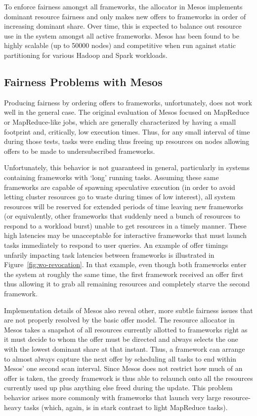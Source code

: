 To enforce fairness amongst all frameworks, the allocator in Mesos implements dominant resource
fairness \cite{drf-paper} and only makes new offers to frameworks in order of increasing
dominant share. Over time, this is expected to balance out resource use in the system amongst
all active frameworks. Mesos has been found to be highly scalable (up to 50000 nodes) and
competitive when run against static partitioning for various Hadoop and Spark workloads.

\subsection{Fairness Problems with Mesos}
Producing fairness by ordering offers to frameworks, unfortunately, does not work well in the
general case. The original evaluation of Mesos focused on MapReduce or MapReduce-like jobs,
which are generally characterized by having a small footprint and, critically, low execution
times. Thus, for any small interval of time during those tests, tasks were ending thus freeing
up resources on nodes allowing offers to be made to undersubscribed frameworks.

Unfortunately, this behavior is not guaranteed in general, particularly in systems containing
frameworks with `long' running tasks. Assuming these same frameworks are capable of spawning
speculative execution (in order to avoid letting cluster resources go to waste during times of
low interest), all system resources will be reserved for extended periods of time leaving new
frameworks (or equivalently, other frameworks that suddenly need a bunch of resources to
respond to a workload burst) unable to get resources in a timely manner. These high latencies
may be unacceptable for interactive frameworks that must launch tasks immediately to respond to
user queries. An example of offer timings unfarily impacting task latencies between frameworks
is illustrated in Figure~\ref{fig:wo-revocation}. In that example, even though both frameworks
enter the system at roughly the same time, the first framework received an offer first thus
allowing it to grab all remaining resources and completely starve the second framework. 

Implementation details of Mesos also reveal other, more subtle fairness issues that are not
properly resolved by the basic offer model. The resource allocator in Mesos takes a snapshot of
all resources currently allotted to frameworks right as it must decide to whom the offer must
be directed and always selects the one with the lowest dominant share at that instant. Thus, a
framework can arrange to almost always capture the next offer by scheduling all tasks to end
within Mesos' one second scan interval. Since Mesos does not restrict how much of an offer is
taken, the greedy framework is thus able to relaunch onto all the resources currently used up
plus anything else freed during the update. This problem behavior arises more commonly with
frameworks that launch very large resource-heavy tasks (which, again, is in stark contrast to
light MapReduce tasks).

